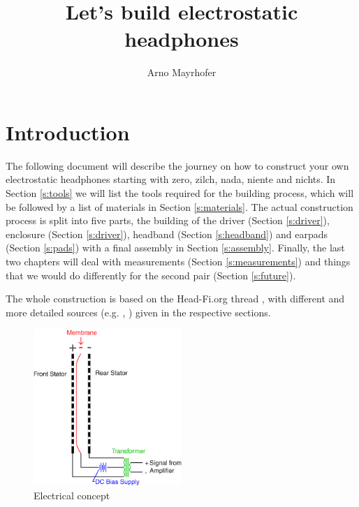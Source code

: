 \documentclass{article}
\begin{document}
\title{Let's build electrostatic headphones}
\author{Arno Mayrhofer}
\maketitle

\tableofcontents

\newpage

\section{Introduction}
\label{s:intro}
The following document will describe the journey on how to construct your own electrostatic headphones starting with zero, zilch, nada, niente and nichts. In Section \ref{s:tools} we will list the tools required for the building process, which will be followed by a list of materials in Section \ref{s:materials}. The actual construction process is split into five parts, the building of the driver (Section \ref{s:driver}), enclosure (Section \ref{s:driver}), headband (Section \ref{s:headband}) and earpads (Section \ref{s:pads}) with a final assembly in Section \ref{s:assembly}. Finally, the last two chapters will deal with measurements (Section \ref{s:measurements}) and things that we would do differently for the second pair (Section \ref{s:future}).

The whole construction is based on the Head-Fi.org thread \cite{head-fi-diy-thread}, with different and more detailed sources (e.g. \cite{electrostatic-hp-design}, \cite{tcengineering-electrostatic-drivers}) given in the respective sections.

\begin{figure}[htb]
    \centering
    \includegraphics[width=0.5\textwidth]{images/esl_animation.png}
    \caption{Electrical concept}
    \label{f:intro:e-concept}
\end{figure}
\end{document}
